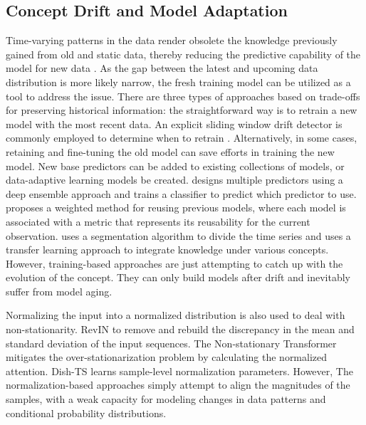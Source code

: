 \documentclass[sigconf]{acmart}
\begin{document}
\subsection{Concept Drift and Model Adaptation}
Time-varying patterns in the data render obsolete the knowledge previously gained from old and static data, thereby reducing the predictive capability of the model for new data \cite{lu2018learning,khamassi2018discussion}. As the gap between the latest and upcoming data distribution is more likely narrow, the fresh training model can be utilized as a tool to address the issue. There are three types of approaches based on trade-offs for preserving historical information: the straightforward way is to retrain a new model with the most recent data. An explicit sliding window drift detector is commonly employed to determine when to retrain \cite{bifet2007learning,li2022ddg}. Alternatively, in some cases, retaining and fine-tuning the old model can save efforts in training the new model. New base predictors can be added to existing collections of models, or data-adaptive learning models be created. \cite{you2021learning} designs multiple predictors using a deep ensemble approach and trains a classifier to predict which predictor to use. \cite{zhao2020handling} proposes a weighted method for reusing previous models, where each model is associated with a metric that represents its reusability for the current observation. \cite{du2021adarnn} uses a segmentation algorithm to divide the time series and uses a transfer learning approach to integrate knowledge under various concepts. However, training-based approaches are just attempting to catch up with the evolution of the concept. They can only build models after drift and inevitably suffer from model aging.

Normalizing the input into a normalized distribution is also used to deal with non-stationarity. RevIN\cite{kim2021reversible} to remove and rebuild the discrepancy in the mean and standard deviation of the input sequences. The Non-stationary Transformer\cite{liu2022non} mitigates the over-stationarization problem by calculating the normalized attention. Dish-TS\cite{fan2023dish} learns sample-level normalization parameters. However, The normalization-based approaches simply attempt to align the magnitudes of the samples, with a weak capacity for modeling changes in data patterns and conditional probability distributions.
\end{document}
